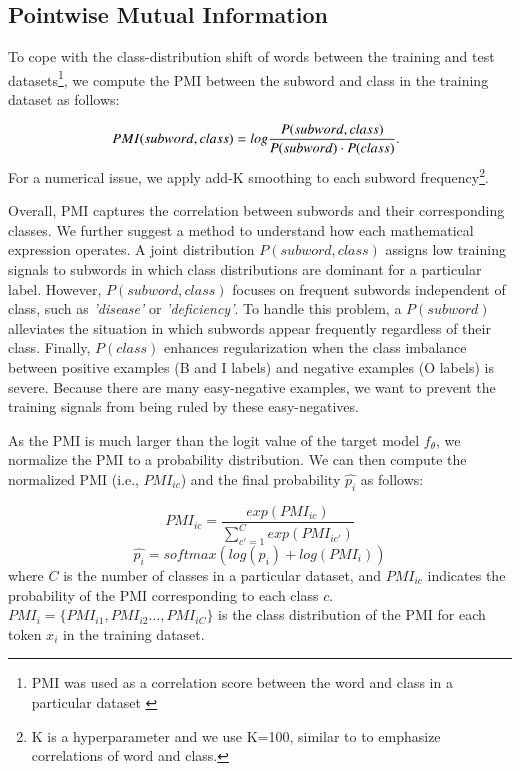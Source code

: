 \documentclass[11pt]{article}
\begin{document}
\subsection{Pointwise Mutual Information}
\label{sec:pmi}
To cope with the class-distribution shift of words between the training and test datasets\footnote{PMI was used as a correlation score between the word and class in a particular dataset \cite{gururangan2018annotation}
}, we compute the PMI between the subword and class in the training dataset as follows:

\vspace{-0.2cm}
\begin{equation}
\hspace*{-0.2cm}
PMI(subword, class) = log\frac{P(subword,class)}{P(subword) \cdot P(class)}.
\label{eq:PMI}
\end{equation}
For a numerical issue, we apply add-K smoothing to each subword frequency\footnote{K is a hyperparameter and we use K=100, similar to \cite{gururangan2018annotation} to emphasize correlations of word and class.}.

Overall, PMI captures the correlation between subwords and their corresponding classes.
We further suggest a method to understand how each mathematical expression operates.
A joint distribution $P(subword, class)$ assigns low training signals to subwords in which class distributions are dominant for a particular label.
However, $P(subword, class)$ focuses on frequent subwords independent of class, such as \textit{'disease'} or \textit{'deficiency'}. 
To handle this problem, a $P(subword)$ alleviates the situation in which subwords appear frequently regardless of their class. 
Finally, $P(class)$ enhances regularization when the class imbalance between positive examples (B and I labels) and negative examples (O labels) is severe.
Because there are many easy-negative examples, we want to prevent the training signals from being ruled by these easy-negatives.


As the PMI is much larger than the logit value of the target model $f_\theta$, we normalize the PMI to a probability distribution. 
We can then compute the normalized PMI (i.e., $PMI_{ic}$) and the final probability $\hat{p_i}$ as follows:

\begin{equation}
    PMI_{ic} = \frac{exp(PMI_{ic})}{\sum_{c'=1}^{C}exp(PMI_{ic'})}
\end{equation}
\begin{equation}
    \hat{p_{i}} = softmax(log(p_i) + log(PMI_i))
\end{equation}
where $C$ is the number of classes in a particular dataset, and $PMI_{ic}$ indicates the probability of the PMI corresponding to each class $c$.
$PMI_i = \{ PMI_{i1}, PMI_{i2} \ldots, PMI_{iC} \}$ is the class distribution of the PMI for each token $x_i$ in the training dataset.
\end{document}
